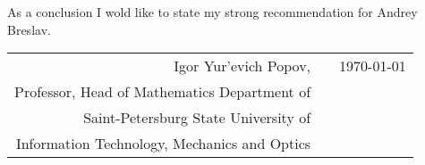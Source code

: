 \documentclass{book}
\begin{document}
As a conclusion I wold like to state my strong recommendation for Andrey Breslav.

\vspace{45pt}
\begin{tabular}{rlr}%
Igor Yur'evich Popov, & \hspace{50pt} & \today \\
Professor, Head of Mathematics Department of &&\\
Saint-Petersburg State University of &&\\
Information Technology, Mechanics and Optics &&\\
\end{tabular}%
\end{document}
